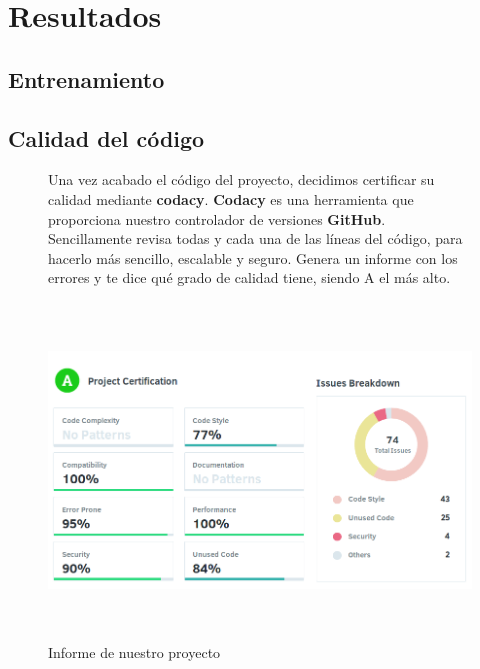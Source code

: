 \cleardoublepage

\chapter{Resultados}
\label{makereference6}

\section{Entrenamiento}
\label{makereference6.1}

\section{Calidad del código}
\label{makereference6.2}

\begin{figure}[htb]
	Una vez acabado el código del proyecto, decidimos certificar su calidad mediante \textbf{codacy}.
	\textbf{Codacy} es una herramienta que proporciona nuestro controlador de versiones \textbf{GitHub}. Sencillamente revisa todas y cada una de las líneas del código, para hacerlo más sencillo, escalable y seguro. Genera un informe con los errores y te dice qué grado de calidad tiene, siendo A el más alto.
	
	\begin{center}
		\includegraphics[height=3.5in]{figures/codacy.png}
		\caption{Informe de nuestro proyecto}
	\end{center}
	
	\label{codacy}
\end{figure}